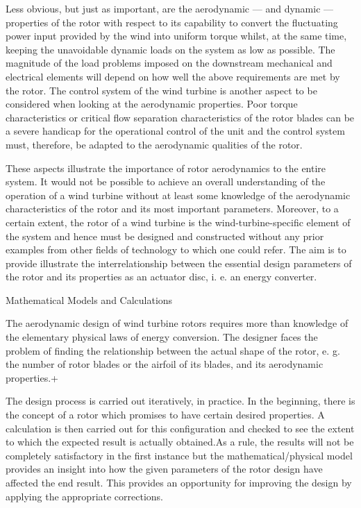 Less obvious, but just as important, are the aerodynamic — and dynamic — properties of the rotor with respect to its capability to convert the fluctuating power input provided by the wind into uniform torque whilst, at the same time, keeping the unavoidable dynamic loads on the system as low as possible. The magnitude of the load problems imposed on the downstream mechanical and electrical elements will depend on how well the above requirements are met by the rotor. The control system of the wind turbine is another aspect to be considered when looking at the aerodynamic properties. Poor torque characteristics or critical flow separation characteristics of the rotor blades can be a severe handicap for the operational control of the unit and the control system must, therefore, be adapted to the aerodynamic qualities of the rotor.

These aspects illustrate the importance of rotor aerodynamics to the entire system. It would not be possible to achieve an overall understanding of the operation of a wind turbine without at least some knowledge of the aerodynamic characteristics of the rotor and its most important parameters. Moreover, to a certain extent, the rotor of a wind turbine is the wind-turbine-specific element of the system and hence must be designed and constructed without any prior examples from other fields of technology to which one could refer.
The aim is to provide illustrate the interrelationship between the essential design parameters of the rotor and its properties as an actuator disc,
i. e. an energy converter.

Mathematical Models and Calculations

The aerodynamic design of wind turbine rotors requires more than knowledge of the elementary physical laws of energy conversion. The designer faces the problem of finding the relationship between the actual shape of the rotor, e. g. the number of rotor blades or the airfoil of its blades, and its aerodynamic properties.+

The design process is carried out iteratively, in practice. In the beginning, there is the concept of a rotor which promises to have certain desired properties. A calculation is then carried out for this configuration and checked to see the extent to which the expected result is actually obtained.As a rule, the results will not be completely satisfactory in the first instance but the mathematical/physical model provides an insight into how the given parameters of the rotor design have affected the end result. This provides an opportunity for improving the design by applying the appropriate corrections.

